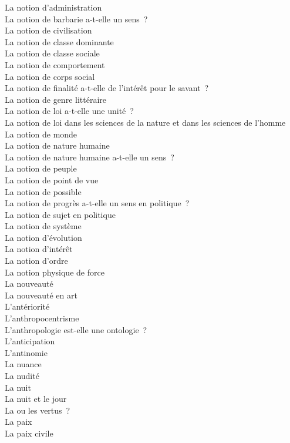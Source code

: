 \documentclass[a4paper,12pt]{article}
\begin{document}
La notion d'administration \\
La notion de barbarie a-t-elle un sens ? \\
La notion de civilisation \\
La notion de classe dominante \\
La notion de classe sociale \\
La notion de comportement \\
La notion de corps social \\
La notion de finalité a-t-elle de l'intérêt pour le savant ? \\
La notion de genre littéraire \\
La notion de loi a-t-elle une unité ? \\
La notion de loi dans les sciences de la nature et dans les sciences de l'homme \\
La notion de monde \\
La notion de nature humaine \\
La notion de nature humaine a-t-elle un sens ? \\
La notion de peuple \\
La notion de point de vue \\
La notion de possible \\
La notion de progrès a-t-elle un sens en politique ? \\
La notion de sujet en politique \\
La notion de système \\
La notion d'évolution \\
La notion d'intérêt \\
La notion d'ordre \\
La notion physique de force \\
La nouveauté \\
La nouveauté en art \\
L'antériorité \\
L'anthropocentrisme \\
L'anthropologie est-elle une ontologie ? \\
L'anticipation \\
L'antinomie \\
La nuance \\
La nudité \\
La nuit \\
La nuit et le jour \\
La ou les vertus ? \\
La paix \\
La paix civile \\
\end{document}

